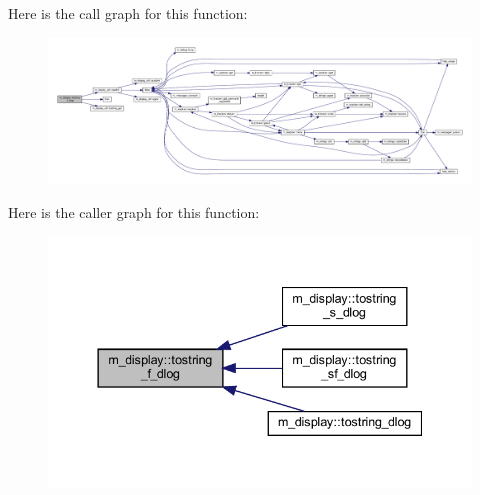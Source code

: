 Here is the call graph for this function\+:
\nopagebreak
\begin{figure}[H]
\begin{center}
\leavevmode
\includegraphics[width=350pt]{namespacem__display_aa23f6d3ab75d3383a0e95a4582cedc87_cgraph}
\end{center}
\end{figure}
Here is the caller graph for this function\+:
\nopagebreak
\begin{figure}[H]
\begin{center}
\leavevmode
\includegraphics[width=337pt]{namespacem__display_aa23f6d3ab75d3383a0e95a4582cedc87_icgraph}
\end{center}
\end{figure}
\mbox{\label{namespacem__display_a3c751ef3422139ca7190d5b0d64638a8}} 

